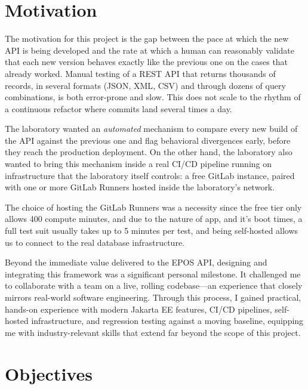 \section{Motivation}
\label{sec:mot}

The motivation for this project is the gap between the pace at which the
new \ac{API} is being developed and the rate at which a human can reasonably
validate that each new version behaves exactly like the previous one on the cases
that already worked. Manual testing of a \ac{REST} \ac{API} that returns
thousands of records, in several formats (\ac{JSON}, \ac{XML}, \ac{CSV})
and through dozens of query combinations, is both error-prone and slow.
This does not scale to the rhythm of a continuous refactor where commits
land several times a day.

\medskip

The laboratory wanted an \emph{automated} mechanism to compare every new
build of the \ac{API} against the previous one and flag behavioral divergences
early, before they reach the production deployment. On the other hand, the
laboratory also wanted to bring this mechanism inside a real \ac{CI}/\ac{CD}
pipeline running on infrastructure that the laboratory itself controls: a free
GitLab instance, paired with one or more GitLab Runners hosted inside the
laboratory's network.

\medskip

The choice of hosting the GitLab Runners was a necessity since the free tier
only allows 400 compute minutes, and due to the nature of app, and it's boot
times, a full test suit usually takes up to 5 minutes per test, and being self-hosted
allows us to connect to the real database infrastructure.

\medskip

Beyond the immediate value delivered to the \ac{EPOS} \ac{API}, designing and
integrating this framework was a significant personal milestone. It
challenged me to collaborate with a team on a live, rolling codebase—an experience
that closely mirrors real-world software engineering. Through this process, I
gained practical, hands-on experience with modern Jakarta EE features, \ac{CI}/\ac{CD}
pipelines, self-hosted infrastructure, and regression testing against a moving
baseline, equipping me with industry-relevant skills that extend far beyond
the scope of this project.

\section{Objectives}
\label{sec:obj}

